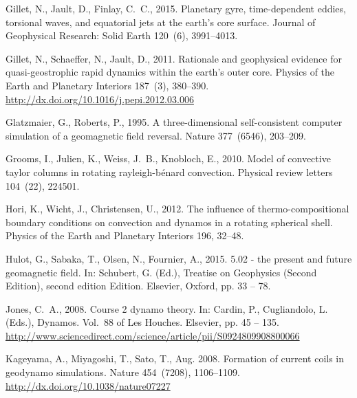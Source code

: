 \documentclass[12pt, a4paper]{article}
\begin{document}
\begin{thebibliography}{73}
Gillet, N., Jault, D., Finlay, C.~C., 2015. Planetary gyre, time-dependent
  eddies, torsional waves, and equatorial jets at the earth's core surface.
  Journal of Geophysical Research: Solid Earth 120~(6), 3991--4013.

Gillet, N., Schaeffer, N., Jault, D., 2011. Rationale and geophysical evidence
  for quasi-geostrophic rapid dynamics within the earth's outer core. Physics
  of the Earth and Planetary Interiors 187~(3), 380--390.
\newline\urlprefix\url{http://dx.doi.org/10.1016/j.pepi.2012.03.006}

Glatzmaier, G., Roberts, P., 1995. A three-dimensional self-consistent computer
  simulation of a geomagnetic field reversal. Nature 377~({6546}), {203--209}.

Grooms, I., Julien, K., Weiss, J.~B., Knobloch, E., 2010. Model of convective
  taylor columns in rotating rayleigh-b{\'e}nard convection. Physical review
  letters 104~(22), 224501.

Hori, K., Wicht, J., Christensen, U., 2012. The influence of
  thermo-compositional boundary conditions on convection and dynamos in a
  rotating spherical shell. Physics of the Earth and Planetary Interiors 196,
  32--48.

Hulot, G., Sabaka, T., Olsen, N., Fournier, A., 2015. 5.02 - the present and
  future geomagnetic field. In: Schubert, G. (Ed.), Treatise on Geophysics
  (Second Edition), second edition Edition. Elsevier, Oxford, pp. 33 -- 78.

Jones, C.~A., 2008. Course 2 dynamo theory. In: Cardin, P., Cugliandolo, L.
  (Eds.), Dynamos. Vol.~88 of Les Houches. Elsevier, pp. 45 -- 135.
\newline\urlprefix\url{http://www.sciencedirect.com/science/article/pii/S0924809908800066}

Kageyama, A., Miyagoshi, T., Sato, T., Aug. 2008. Formation of current coils in
  geodynamo simulations. Nature 454~(7208), 1106--1109.
\newline\urlprefix\url{http://dx.doi.org/10.1038/nature07227}


\end{thebibliography}
\end{document}
